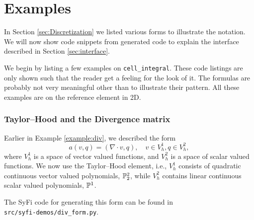 \chapter{Examples}
\label{sec:formexamples}

\label{CodeGenExamples}
In Section \ref{sec:Discretization} we listed various forms to
illustrate the notation. We will now show code snippets from generated
code to explain the interface described in Section
\ref{sec:interface}.

We begin by listing a few examples on \texttt{cell\_integral}. 
These code listings are only shown such that the reader get 
a feeling for the look of it. The formulas are probably not
very meaningful other than to illustrate their pattern. 
All these examples are on the reference element in 2D. 

\subsection{Taylor--Hood and the Divergence matrix} 
Earlier in Example \ref{example:div}, we described  
the form 
\begin{equation}
a(v,q) = (\nabla \cdot v, q), \quad v\in V_h^1, q \in V_h^2, 
\end{equation}
where $V_h^1$ is a space of vector valued functions, 
and $V_h^2$ is a space of scalar valued functions. 
We now use the Taylor--Hood element,  
i.e., $V_h^1$ consists of quadratic continuous vector valued polynomials, $\P^2_2$,
while $V_h^2$ contains linear continuous scalar valued polynomials, $\P^1$.  

The SyFi code for generating this form can be found in \\ 
\texttt{src/syfi-demos/div\_form.py}.

